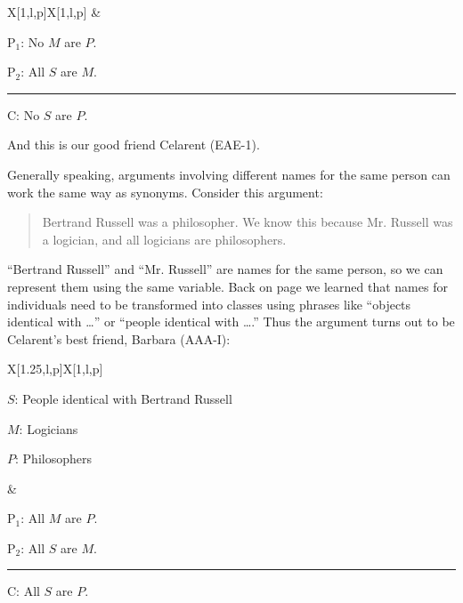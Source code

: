 {\begin{tabu}{{X[1,l,p]X[1,l,p]}}
&

\begin{earg}
\item[P$_1$:]  No $M$ are $P$.
\item[P$_2$:] All $S$ are $M$.
\vspace{-.5em}
\item [] \rule{0.4\linewidth}{.5pt} 
\item[C:] No $S$ are $P$.
\end{earg} 

\end{tabu}

And this is our good friend Celarent (EAE-1). 

Generally speaking, arguments involving different names for the same person can work the same way as synonyms. Consider this argument:

\begin{quotation}
\noindent Bertrand Russell was a philosopher. We know this because Mr. Russell was a logician, and all logicians are philosophers. 
\end{quotation}

``Bertrand Russell'' and ``Mr. Russell'' are names for the same person, so we can represent them using the same variable. Back on page \pageref{subsec:singular_propositions} we learned that names for individuals need to be transformed into classes using phrases like ``objects identical with \ldots'' or ``people identical with \ldots.''  Thus the argument turns out to be Celarent's best friend, Barbara (AAA-I):

\begin{tabu}{{X[1.25,l,p]X[1,l,p]}}


\begin{ekey}
\item[$S$:] People identical with Bertrand Russell
\item[$M$:] Logicians
\item[$P$:] Philosophers 
\end{ekey}

&

\begin{earg}
\item[P$_1$:]  All $M$ are $P$.
\item[P$_2$:] All $S$ are $M$.
\vspace{-.5em}
\item [] \rule{0.4\linewidth}{.5pt} 
\item[C:] All $S$ are $P$.
\end{earg} 


\end{tabu}}
